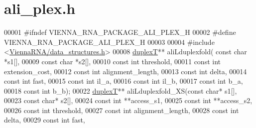 \hypertarget{ali__plex_8h_source}{\section{ali\+\_\+plex.\+h}
\label{ali__plex_8h_source}
}

\begin{DoxyCode}
00001 \textcolor{preprocessor}{#ifndef VIENNA\_RNA\_PACKAGE\_ALI\_PLEX\_H}
00002 \textcolor{preprocessor}{#define VIENNA\_RNA\_PACKAGE\_ALI\_PLEX\_H}
00003 
00004 \textcolor{preprocessor}{#include <\hyperlink{data__structures_8h}{ViennaRNA/data\_structures.h}>}
00008 \hyperlink{group__data__structures_structduplexT}{duplexT}** aliLduplexfold( \textcolor{keyword}{const} \textcolor{keywordtype}{char} *s1[],
00009                           \textcolor{keyword}{const} \textcolor{keywordtype}{char} *s2[],
00010                           \textcolor{keyword}{const} \textcolor{keywordtype}{int} threshold,
00011                           \textcolor{keyword}{const} \textcolor{keywordtype}{int} extension\_cost,
00012                           \textcolor{keyword}{const} \textcolor{keywordtype}{int} alignment\_length,
00013                           \textcolor{keyword}{const} \textcolor{keywordtype}{int} delta,
00014                           \textcolor{keyword}{const} \textcolor{keywordtype}{int} fast,
00015                           \textcolor{keyword}{const} \textcolor{keywordtype}{int} il\_a,
00016                           \textcolor{keyword}{const} \textcolor{keywordtype}{int} il\_b,
00017                           \textcolor{keyword}{const} \textcolor{keywordtype}{int} b\_a,
00018                           \textcolor{keyword}{const} \textcolor{keywordtype}{int} b\_b);
00022 \hyperlink{group__data__structures_structduplexT}{duplexT}** aliLduplexfold\_XS(\textcolor{keyword}{const} \textcolor{keywordtype}{char}* s1[],
00023                             \textcolor{keyword}{const} \textcolor{keywordtype}{char}* s2[],
00024                             \textcolor{keyword}{const} \textcolor{keywordtype}{int} **access\_s1,
00025                             \textcolor{keyword}{const} \textcolor{keywordtype}{int} **access\_s2, 
00026                             \textcolor{keyword}{const} \textcolor{keywordtype}{int} threshold,
00027                             \textcolor{keyword}{const} \textcolor{keywordtype}{int} alignment\_length,
00028                             \textcolor{keyword}{const} \textcolor{keywordtype}{int} delta,
00029                             \textcolor{keyword}{const} \textcolor{keywordtype}{int} fast,

\end{DoxyCode}
